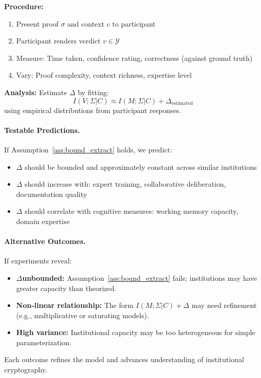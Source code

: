 \documentclass{ieeeaccess}
\begin{document}
\textbf{Procedure:}
\begin{enumerate}
\item Present proof $\sigma$ and context $c$ to participant
\item Participant renders verdict $v \in \mathcal{Y}$
\item Measure: Time taken, confidence rating, correctness (against ground truth)
\item Vary: Proof complexity, context richness, expertise level
\end{enumerate}

\textbf{Analysis:} Estimate $\Delta$ by fitting:
\begin{equation}
I(V;\Sigma|C) \approx I(M;\Sigma|C) + \Delta_{\text{estimated}}
\end{equation}
using empirical distributions from participant responses.

\paragraph{Testable Predictions.}
If Assumption~\ref{ass:bound_extract} holds, we predict:
\begin{itemize}
\item $\Delta$ should be bounded and approximately constant across similar institutions
\item $\Delta$ should increase with: expert training, collaborative deliberation, documentation quality
\item $\Delta$ should correlate with cognitive measures: working memory capacity, domain expertise
\end{itemize}

\paragraph{Alternative Outcomes.}
If experiments reveal:
\begin{itemize}
\item $\Delta$\textbf{unbounded:} Assumption~\ref{ass:bound_extract} fails; institutions may have greater capacity than theorized.
\item \textbf{Non-linear relationship:} The form $I(M;\Sigma|C) + \Delta$ may need refinement (e.g., multiplicative or saturating models).
\item \textbf{High variance:} Institutional capacity may be too heterogeneous for simple parameterization.
\end{itemize}

Each outcome refines the model and advances understanding of institutional cryptography.
\end{document}
